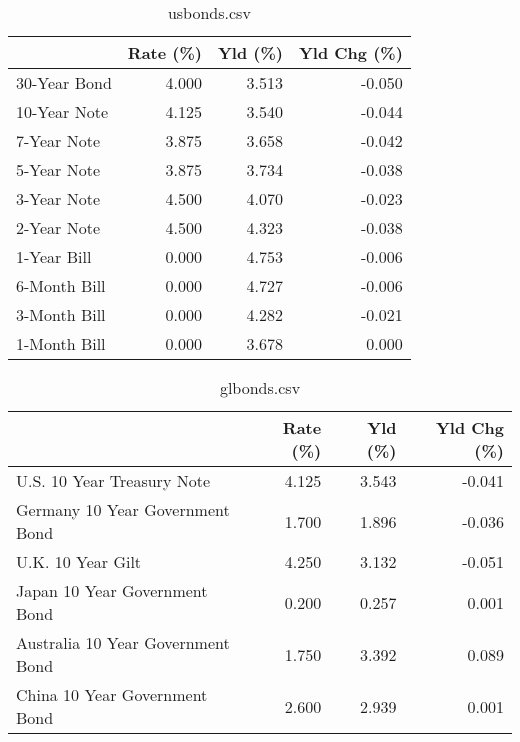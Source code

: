 \documentclass{article}%
\begin{document}
%


\begin{table}[htbp]%
\caption{usbonds.csv}%
\centering%
\begin{adjustbox}{width=1\textwidth}%
\begin{tabular}{lrrr}
\toprule
             &  Rate (\%) &  Yld (\%) &  Yld Chg (\%) \\
\midrule
30-Year Bond &     4.000 &    3.513 &       -0.050 \\
10-Year Note &     4.125 &    3.540 &       -0.044 \\
 7-Year Note &     3.875 &    3.658 &       -0.042 \\
 5-Year Note &     3.875 &    3.734 &       -0.038 \\
 3-Year Note &     4.500 &    4.070 &       -0.023 \\
 2-Year Note &     4.500 &    4.323 &       -0.038 \\
 1-Year Bill &     0.000 &    4.753 &       -0.006 \\
6-Month Bill &     0.000 &    4.727 &       -0.006 \\
3-Month Bill &     0.000 &    4.282 &       -0.021 \\
1-Month Bill &     0.000 &    3.678 &        0.000 \\
\bottomrule
\end{tabular}
%
\end{adjustbox}%
\end{table}

%


\begin{table}[htbp]%
\caption{glbonds.csv}%
\centering%
\begin{adjustbox}{width=1\textwidth}%
\begin{tabular}{lrrr}
\toprule
                                  &  Rate (\%) &  Yld (\%) &  Yld Chg (\%) \\
\midrule
       U.S. 10 Year Treasury Note &     4.125 &    3.543 &       -0.041 \\
  Germany 10 Year Government Bond &     1.700 &    1.896 &       -0.036 \\
                U.K. 10 Year Gilt &     4.250 &    3.132 &       -0.051 \\
    Japan 10 Year Government Bond &     0.200 &    0.257 &        0.001 \\
Australia 10 Year Government Bond &     1.750 &    3.392 &        0.089 \\
    China 10 Year Government Bond &     2.600 &    2.939 &        0.001 \\
\bottomrule
\end{tabular}
%
\end{adjustbox}%
\end{table}
\end{document}
